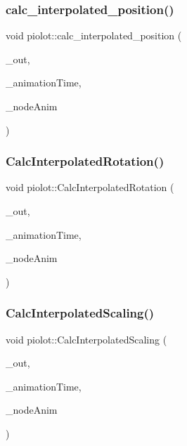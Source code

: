 \subsubsection{\texorpdfstring{calc\+\_\+interpolated\+\_\+position()}{calc\_interpolated\_position()}}
{\footnotesize\ttfamily void piolot\+::calc\+\_\+interpolated\+\_\+position (\begin{DoxyParamCaption}\item[{ai\+Vector3D \&}]{\+\_\+out,  }\item[{float}]{\+\_\+animation\+Time,  }\item[{const ai\+Node\+Anim $\ast$}]{\+\_\+node\+Anim }\end{DoxyParamCaption})}

\mbox{\label{namespacepiolot_a22a267ba7b419acc67701bad790e186f}} 
\subsubsection{\texorpdfstring{Calc\+Interpolated\+Rotation()}{CalcInterpolatedRotation()}}
{\footnotesize\ttfamily void piolot\+::\+Calc\+Interpolated\+Rotation (\begin{DoxyParamCaption}\item[{ai\+Quaternion \&}]{\+\_\+out,  }\item[{float}]{\+\_\+animation\+Time,  }\item[{const ai\+Node\+Anim $\ast$}]{\+\_\+node\+Anim }\end{DoxyParamCaption})}

\mbox{\label{namespacepiolot_a66a046124f1f3d518e9f66ad63de5f51}} 
\subsubsection{\texorpdfstring{Calc\+Interpolated\+Scaling()}{CalcInterpolatedScaling()}}
{\footnotesize\ttfamily void piolot\+::\+Calc\+Interpolated\+Scaling (\begin{DoxyParamCaption}\item[{ai\+Vector3D \&}]{\+\_\+out,  }\item[{float}]{\+\_\+animation\+Time,  }\item[{const ai\+Node\+Anim $\ast$}]{\+\_\+node\+Anim }\end{DoxyParamCaption})}

